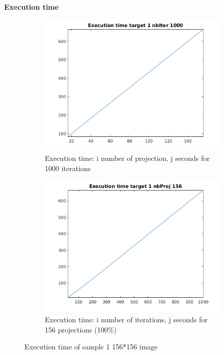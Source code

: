 \documentclass[10pt,a4paper,titlepage]{article}
\begin{document}
\clearpage
\textbf{Execution time}\\
				
		\begin{figure}[H]
			\begin{subfigure}[b]{0.49\textwidth}
				\includegraphics[width=\textwidth]{Sample1/execTimeProj}
				\caption{Execution time: i number of projection, j seconds for 1000 iterations}
				\label{subfig:ContrastFBP}
			\end{subfigure}
			\begin{subfigure}[b]{0.49\textwidth}
				\includegraphics[width=\textwidth]{Sample1/execTimeIt}
				\caption{Execution time: i number of iterations, j seconds for 156 projections (100\%)}
				\label{subfig:ContrastSB}
			\end{subfigure}
			\caption{Execution time of sample 1 156*156 image}
			\label{fig:contrastsF1}
		\end{figure}
		
\end{document}
